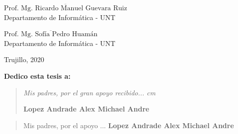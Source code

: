 \vskip 1cm
\begin{flushleft} 
$\overline{\mbox{Prof. Mg. Ricardo Manuel Guevara Ruiz}}$\\
\vskip -0.5cm
Departamento de Informática - UNT
\end{flushleft} 
\vskip 1cm
\begin{flushleft} 
$\overline{\mbox{Prof. Mg. Sofía Pedro Huamán}}$\\
\vskip -0.5cm
Departamento de Informática - UNT
\end{flushleft}
\vskip 0.8cm 
\begin{center}    
Trujillo, 2020
\end{center} 
\newpage

\newpage
 \pagestyle{plain}
 
 {\bf\Large {Dedico esta tesis a:}}
 \vskip 1cm
\begin{quotation}
{\it Mis padres, por el gran apoyo recibido...
 cm

\vskip 1cm
\textbf{Lopez Andrade Alex Michael Andre }}
\end{quotation}
\newpage

\newpage

 {\bf\Large {}}
 \vskip 1.5cm
 {\bf\Large {}}
\begin{quotation}
Mis padres, por el apoyo ...
\vskip 1cm
\textbf{Lopez Andrade Alex Michael Andre }  %
 \end{quotation}
 


%



